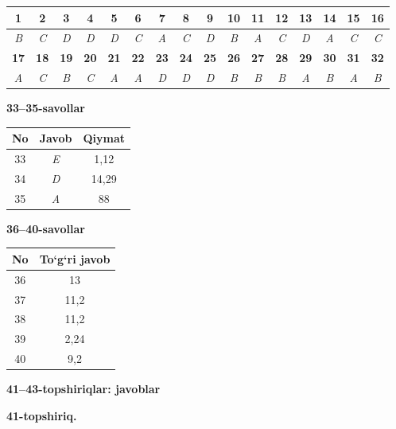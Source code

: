 \documentclass[11pt,a4paper]{article}
\begin{document}
\noindent\begin{tabular}{|c|c|c|c|c|c|c|c|c|c|c|c|c|c|c|c|}\hline
\textbf{1} & \textbf{2} & \textbf{3} & \textbf{4} & \textbf{5} & \textbf{6} & \textbf{7} & \textbf{8} & \textbf{9} & \textbf{10} & \textbf{11} & \textbf{12} & \textbf{13} & \textbf{14} & \textbf{15} & \textbf{16}\\\hline
\textsl{B} & \textsl{C} & \textsl{D} & \textsl{D} & \textsl{D} & \textsl{C} & \textsl{A} & \textsl{C} & \textsl{D} & \textsl{B} & \textsl{A} & \textsl{C} & \textsl{D} & \textsl{A} & \textsl{C} & \textsl{C}\\\hline
\textbf{17} & \textbf{18} & \textbf{19} & \textbf{20} & \textbf{21} & \textbf{22} & \textbf{23} & \textbf{24} & \textbf{25} & \textbf{26} & \textbf{27} & \textbf{28} & \textbf{29} & \textbf{30} & \textbf{31} & \textbf{32}\\\hline
\textsl{A} & \textsl{C} & \textsl{B} & \textsl{C} & \textsl{A} & \textsl{A} & \textsl{D} & \textsl{D} & \textsl{D} & \textsl{B} & \textsl{B} & \textsl{B} & \textsl{A} & \textsl{B} & \textsl{A} & \textsl{B}\\\hline
\end{tabular}\par\medskip
\noindent\textbf{33--35-savollar}\par\smallskip
\noindent\begin{tabular}{|c|c|c|}\hline \textbf{No} & \textbf{Javob} & \textbf{Qiymat}\\\hline
33 & \textsl{E} & 1,12\\\hline
34 & \textsl{D} & 14,29\\\hline
35 & \textsl{A} & 88\\\hline
\end{tabular}\par\medskip
\noindent\textbf{36--40-savollar}\par\smallskip
\noindent\begin{tabular}{|c|c|}\hline \textbf{No} & \textbf{To`g`ri javob}\\\hline
36 & 13\\\hline
37 & 11,2\\\hline
38 & 11,2\\\hline
39 & 2,24\\\hline
40 & 9,2\\\hline
\end{tabular}\par\medskip
\noindent\textbf{41--43-topshiriqlar: javoblar}\par\smallskip
\noindent\textbf{41-topshiriq.}\par
\end{document}
